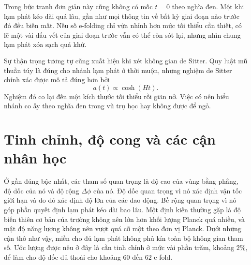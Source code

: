 Trong bức tranh đơn giản này cũng không có mốc \(t=0\) theo nghĩa đen. Một khi lạm phát kéo dài quá lâu, gần như mọi thông tin về bất kỳ giai đoạn nào trước đó đều biến mất. Nếu số e-folding chỉ vừa nhỉnh hơn mức tối thiểu cần thiết, có lẽ một vài dấu vết của giai đoạn trước vẫn có thể còn sót lại, nhưng nhìn chung lạm phát xóa sạch quá khứ.

Sự thận trọng tương tự cũng xuất hiện khi xét không gian de Sitter. Quy luật mũ thuần túy là đúng cho nhánh lạm phát ở thời muộn, nhưng nghiệm de Sitter chính xác được mô tả đúng hơn bởi
\begin{equation}
a(t)\propto \cosh(Ht).
\end{equation}
Nghiệm đó co lại đến một kích thước tối thiểu rồi giãn nở. Việc có nên hiểu nhánh co ấy theo nghĩa đen trong vũ trụ học hay không được để ngỏ.

\begin{classroomqa}
\end{classroomqa}

\section{Tinh chỉnh, độ cong và các cận nhân học}

Ở gần đúng bậc nhất, các tham số quan trọng là độ cao của vùng bằng phẳng, độ dốc của nó và độ rộng \(\Delta\phi\) của nó. Độ dốc quan trọng vì nó xác định vận tốc giới hạn và do đó xác định độ lớn của các dao động. Bề rộng quan trọng vì nó góp phần quyết định lạm phát kéo dài bao lâu. Một định kiến thường gặp là độ biến thiên cơ bản của trường không nên lớn hơn khối lượng Planck quá nhiều, và mật độ năng lượng không nên vượt quá cỡ một theo đơn vị Planck. Dưới những cận thô như vậy, miền cho đủ lạm phát không phủ kín toàn bộ không gian tham số. Ước lượng được nêu ở đây là cần tinh chỉnh ở mức vài phần trăm, khoảng \(2\%\), để làm cho độ dốc đủ thoải cho khoảng \(60\) đến \(62\) e-fold.

\begin{classroomqa}
\end{classroomqa}

